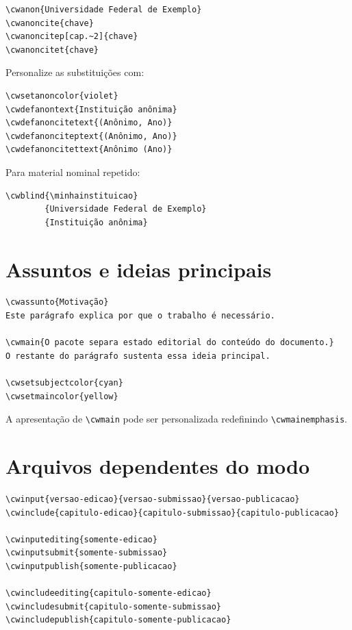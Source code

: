 \documentclass[11pt]{article}
\newcommand{\cmd}[1]{\texttt{\textbackslash#1}}
\begin{document}
\begin{verbatim}
\cwanon{Universidade Federal de Exemplo}
\cwanoncite{chave}
\cwanoncitep[cap.~2]{chave}
\cwanoncitet{chave}
\end{verbatim}

Personalize as substituições com:

\begin{verbatim}
\cwsetanoncolor{violet}
\cwdefanontext{Instituição anônima}
\cwdefanoncitetext{(Anônimo, Ano)}
\cwdefanonciteptext{(Anônimo, Ano)}
\cwdefanoncitettext{Anônimo (Ano)}
\end{verbatim}

Para material nominal repetido:

\begin{verbatim}
\cwblind{\minhainstituicao}
        {Universidade Federal de Exemplo}
        {Instituição anônima}
\end{verbatim}

\section*{Assuntos e ideias principais}

\begin{verbatim}
\cwassunto{Motivação}
Este parágrafo explica por que o trabalho é necessário.

\cwmain{O pacote separa estado editorial do conteúdo do documento.}
O restante do parágrafo sustenta essa ideia principal.

\cwsetsubjectcolor{cyan}
\cwsetmaincolor{yellow}
\end{verbatim}

A apresentação de \cmd{cwmain} pode ser personalizada redefinindo \cmd{cwmainemphasis}.

\section*{Arquivos dependentes do modo}

\begin{verbatim}
\cwinput{versao-edicao}{versao-submissao}{versao-publicacao}
\cwinclude{capitulo-edicao}{capitulo-submissao}{capitulo-publicacao}

\cwinputediting{somente-edicao}
\cwinputsubmit{somente-submissao}
\cwinputpublish{somente-publicacao}

\cwincludeediting{capitulo-somente-edicao}
\cwincludesubmit{capitulo-somente-submissao}
\cwincludepublish{capitulo-somente-publicacao}
\end{verbatim}
\end{document}
